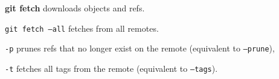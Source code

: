 %

\textbf{git fetch} downloads objects and refs.

\texttt{git fetch --all} fetches from all remotes.

\begin{compactenum}
\item [\texttt{-p}] prunes refs that no longer exist on the remote (equivalent to \texttt{--prune}),
\item [\texttt{-t}] fetches all tags from the remote (equivalent to \texttt{--tags}).
\end{compactenum}

%
